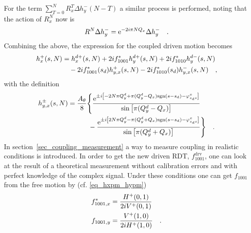 %
For the term $\sum\limits_{T = 0}^N R_x^{T}\Delta h_y^-(N-T) $ a similar process is performed, noting that
the action of $R_x^N$ now is 
%
\begin{equation}
R^N\Delta h_y^- = \text{e}^{-2 i \pi N Q_x} \Delta h_y^-
\quad .
\end{equation}
%
Combining the above, the expression for the coupled driven motion becomes
%
\begin{align}
    h_x^+(s,N)&=
    h_x^{d+}(s,N) + 2if^{*}_{1001}  h_y^{d+}(s,N) + 2if^{*}_{1010} h_y^{d-}(s,N) \notag \\
    &\quad
    -2if^*_{1001}(s_d) h_{y,x}^+(s,N)
    -2if^*_{1010}(s_d) h_{y,x}^-(s,N)
    \quad ,
\end{align}
with the definition
%
\begin{align}
    h_{y,x}^\pm(s,N) &= 
        \frac{A_\theta}{8} \Bigg\{
             \frac{\text{e}^{\pm i \left[-2N \pi Q_y^d + \pi( Q_y^d - Q_x )\text{sgn}(s-s_d) - \varphi_{s_ds}^{x}\right]}}
                {\sin\left[\pi (Q_y^d - Q_x)\right]}
                \notag \\  & \quad\quad\quad
            -\frac{\text{e}^{ \pm i \left[2N\pi Q_y^d - \pi( Q_y^d + Q_x )\text{sgn}(s-s_d) - \varphi_{s_ds}^{x}\right]}}
                {\sin\left[\pi (Q_y^d + Q_x)\right]}
        \Bigg\}
        \quad .
\end{align}
%
%
In section~\ref{sec_coupling_measurement} a way to measure coupling in realistic conditions is introduced.
In order to get the new driven RDT, $f_{1001}^\text{drv}$, one can look at the result of a theoretical
measurement without calibration errors and with perfect knowledge of the complex signal.
Under these conditions one can get $f_{1001}$ from the free motion by (cf. \eqref{eq_hxpm_hypm})
%
\begin{align}
    f_{1001,x}^* &= \frac{H^+(0,1)}{2iV^+(0,1)}
    \label{eq_f1001x_from_complex}
    \\
    f_{1001,y} &= \frac{V^+(1,0)}{2iH^+(1,0)}
    \label{eq_f1001y_from_complex}
    \quad .
\end{align}
